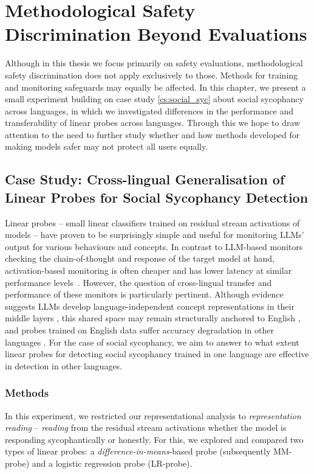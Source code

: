 \chapter{Methodological Safety Discrimination Beyond Evaluations}
\label{chap:probes}
 Although in this thesis we focus primarily on safety evaluations, methodological safety discrimination does not apply exclusively to those. Methods for training and monitoring safeguards may equally be affected. In this chapter, we present a small experiment building on case study \ref{cs:social_syc} about social sycophancy across languages, in which we investigated differences in the performance and transferability of linear probes across languages. Through this we hope to draw attention to the need to further study whether and how methods developed for making models safer may not protect all users equally.

 
\section{Case Study: Cross-lingual Generalisation of Linear Probes for Social Sycophancy Detection}

Linear probes – small linear classifiers trained on residual stream activations of models – have proven to be surprisingly simple and useful for monitoring LLMs' output for various behaviours and concepts. In contrast to LLM-based monitors checking the chain-of-thought and response of the target model at hand, activation-based monitoring is often cheaper and has lower latency at similar performance levels~\cite{mckenzie2025detecting-612}. However, the question of cross-lingual transfer and performance of these monitors is particularly pertinent. Although evidence suggests LLMs develop language-independent concept representations in their middle layers \cite{muller-etal-2021-first, wang2025lost-9a1, liu-niehues-2025-middle}, this shared space may remain structurally anchored to English \cite{wendler2024do-f67}, and probes trained on English data suffer accuracy degradation in other languages \cite{li2024exploring-99e}. For the case of social sycophancy, we aim to answer to what extent linear probes for detecting social sycophancy trained in one language are effective in detection in other languages. 

\subsection{Methods}
In this experiment, we restricted our representational analysis  to \textit{representation reading} – \textit{reading} from the residual stream activations whether the model is responding sycophantically or honestly. For this, we explored and compared two types of linear probes: a \textit{difference-in-means}-based probe \cite{belrose2023diff-in-means-196} (subsequently MM-probe) and a logistic regression probe (LR-probe). 

